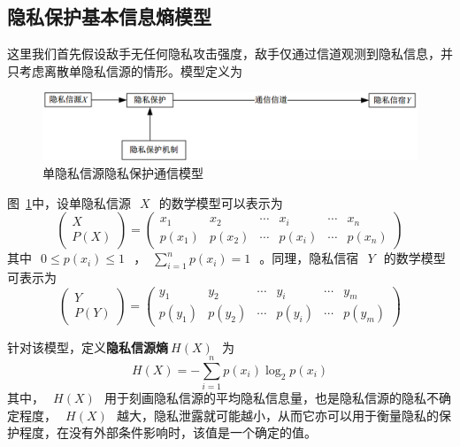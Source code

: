 \subsection{隐私保护基本信息熵模型}

这里我们首先假设敌手无任何隐私攻击强度，敌手仅通过信道观测到隐私信息，并只考虑离散单隐私信源的情形。模型定义为
\begin{figure}[htbp]
	\centering
	\includegraphics[width = 0.95\linewidth]{./figures/Communication-Model-for-Privacy.png}
	\caption{单隐私信源隐私保护通信模型}
	\label{fig:communication-model-privacy}
\end{figure}

图~\ref{fig:communication-model-privacy}中，设单隐私信源~$~X~$~的数学模型可以表示为
\begin{equation}
\begin{pmatrix}
X\\ 
P(X)
\end{pmatrix}=\begin{pmatrix}
x_{1} & x_{2} & \cdots  & x_{i} & \cdots  & x_{n}\\ 
p(x_{1})& p(x_{2}) & \cdots & p(x_{i}) & \cdots & p(x_{n})
\end{pmatrix}
\end{equation}
其中~$~0\leqslant p(x_{i})\leqslant1~$~，~$\sum_{i=1}^{n}p(x_{i})=1~$~。同理，隐私信宿~$~Y~$~的数学模型可表示为
\begin{equation}
\label{eq:single-information-source}
\begin{pmatrix}
Y\\ 
P(Y)
\end{pmatrix}=\begin{pmatrix}
y_{1} & y_{2} & \cdots  & y_{i} & \cdots  & y_{m}\\ 
p(y_{1})& p(y_{2}) & \cdots & p(y_{i}) & \cdots & p(y_{m})
\end{pmatrix}
\end{equation}

针对该模型，定义\textbf{隐私信源熵}$~H(X)~$~为
\begin{equation}
H(X)=-\sum_{i=1}^{n}p(x_{i})\log_{2}p(x_{i})
\end{equation}
其中，~$~H(X)~$~用于刻画隐私信源的平均隐私信息量，也是隐私信源的隐私不确定程度，~$~H(X)~$~越大，隐私泄露就可能越小，从而它亦可以用于衡量隐私的保护程度，在没有外部条件影响时，该值是一个确定的值。

